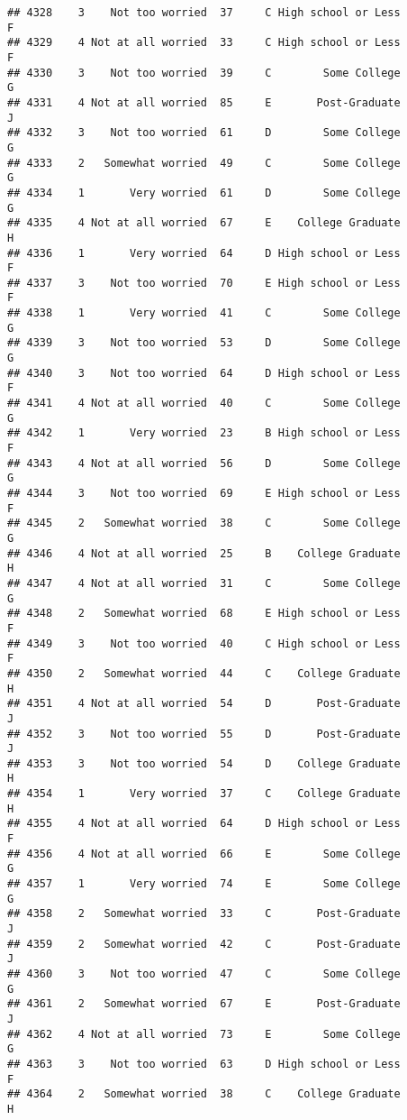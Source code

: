 \documentclass[
]{article}
\begin{document}
\begin{verbatim}
## 4328    3    Not too worried  37     C High school or Less         F
## 4329    4 Not at all worried  33     C High school or Less         F
## 4330    3    Not too worried  39     C        Some College         G
## 4331    4 Not at all worried  85     E       Post-Graduate         J
## 4332    3    Not too worried  61     D        Some College         G
## 4333    2   Somewhat worried  49     C        Some College         G
## 4334    1       Very worried  61     D        Some College         G
## 4335    4 Not at all worried  67     E    College Graduate         H
## 4336    1       Very worried  64     D High school or Less         F
## 4337    3    Not too worried  70     E High school or Less         F
## 4338    1       Very worried  41     C        Some College         G
## 4339    3    Not too worried  53     D        Some College         G
## 4340    3    Not too worried  64     D High school or Less         F
## 4341    4 Not at all worried  40     C        Some College         G
## 4342    1       Very worried  23     B High school or Less         F
## 4343    4 Not at all worried  56     D        Some College         G
## 4344    3    Not too worried  69     E High school or Less         F
## 4345    2   Somewhat worried  38     C        Some College         G
## 4346    4 Not at all worried  25     B    College Graduate         H
## 4347    4 Not at all worried  31     C        Some College         G
## 4348    2   Somewhat worried  68     E High school or Less         F
## 4349    3    Not too worried  40     C High school or Less         F
## 4350    2   Somewhat worried  44     C    College Graduate         H
## 4351    4 Not at all worried  54     D       Post-Graduate         J
## 4352    3    Not too worried  55     D       Post-Graduate         J
## 4353    3    Not too worried  54     D    College Graduate         H
## 4354    1       Very worried  37     C    College Graduate         H
## 4355    4 Not at all worried  64     D High school or Less         F
## 4356    4 Not at all worried  66     E        Some College         G
## 4357    1       Very worried  74     E        Some College         G
## 4358    2   Somewhat worried  33     C       Post-Graduate         J
## 4359    2   Somewhat worried  42     C       Post-Graduate         J
## 4360    3    Not too worried  47     C        Some College         G
## 4361    2   Somewhat worried  67     E       Post-Graduate         J
## 4362    4 Not at all worried  73     E        Some College         G
## 4363    3    Not too worried  63     D High school or Less         F
## 4364    2   Somewhat worried  38     C    College Graduate         H

\end{verbatim}
\end{document}
